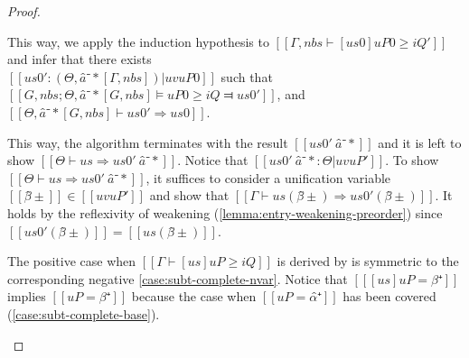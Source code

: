 \begin{proof}
\begin{caseof}
       This way, we apply the induction hypothesis to $[[Γ, nbs ⊢ [us0]uP0 ≥ iQ' ]]$ and 
       infer that there exists\\
        $[[us0' :  (Θ, â⁻*[Γ, nbs]) | uv uP0]]$ such that
       $[[G, nbs; Θ, â⁻*[G, nbs] ⊨ uP0 ≥ iQ ⫤ us0']]$,
       and $[[Θ, â⁻*[G, nbs] ⊢ us0' ⇒ us0]]$.

       This way, the algorithm terminates with the result $[[us0' \ {â⁻*}]]$
       and it is left to show $[[ Θ ⊢ us ⇒ us0' \ {â⁻*} ]]$. Notice that
       $[[us0' \ {â⁻*} : Θ | uv uP' ]]$. To show $[[ Θ ⊢ us ⇒ us0' \
       {â⁻*} ]]$, it suffices to consider a unification variable $[[β̂±]] \in 
       [[uv uP']]$ and show that $[[Γ ⊢ us(β̂±) ⇒ us0'(β̂±)]]$. It holds by the
       reflexivity of weakening (\cref{lemma:entry-weakening-preorder}) since
       $[[us0'(β̂±)]] = [[us(β̂±)]]$.

      \item The positive case when $[[Γ ⊢ [us]uP ≥ iQ]]$ is derived by 
      \ruleref{\ottdruleDOnePVarLabel} is symmetric to the corresponding negative
      \cref{case:subt-complete-nvar}.
      Notice that $[[ [us]uP = β⁺ ]]$ 
      implies $[[uP = β⁺]]$ because the case when $[[uP = α̂⁺]]$ has been covered 
      (\cref{case:subt-complete-base}).

    \end{caseof}
\end{proof}
